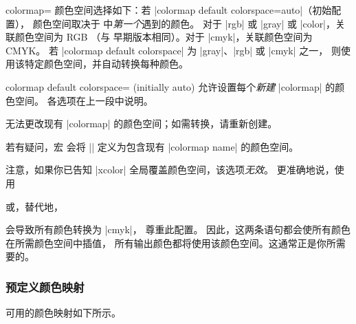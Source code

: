 \begin{pgfplotskey}{colormap=}
    颜色空间选择如下：若 |colormap default colorspace=auto|（初始配置），
    颜色空间取决于  中\emph{第一个}遇到的颜色。
    对于 |rgb| 或 |gray| 或 |color|，关联颜色空间为 RGB
    （与 \PGFPlots{} 早期版本相同）。对于 |cmyk|，关联颜色空间为 CMYK。
    若 |colormap default colorspace| 为 |gray|、|rgb| 或 |cmyk| 之一，
    则使用该特定颜色空间，并自动转换每种颜色。

    \begin{pgfplotskey}{colormap default colorspace= (initially auto)}
        允许设置每个\emph{新建} |colormap| 的颜色空间。
        各选项在上一段中说明。

        无法更改现有 |colormap| 的颜色空间；如需转换，请重新创建。

        若有疑问，宏 \declareandlabel{\pgfplotscolormapgetcolorspace}
        会将 |\pgfplotsretval| 定义为包含现有 |colormap name| 的颜色空间。

        注意，如果你已告知 |xcolor| 全局覆盖颜色空间，该选项\emph{无效}。
        更准确地说，使用
\begin{codeexample}
\usepackage[cmyk]{xcolor}
\end{codeexample}
        或，替代地，
\begin{codeexample}
\end{codeexample}
        会导致所有颜色转换为 |cmyk|，\PGFPlots{} 尊重此配置。
        因此，这两条语句都会使所有颜色在所需颜色空间中插值，
        所有输出颜色都将使用该颜色空间。这通常正是你所需要的。
    \end{pgfplotskey}


    \subsubsection{预定义颜色映射}

    可用的颜色映射如下所示。
\end{pgfplotskey}

